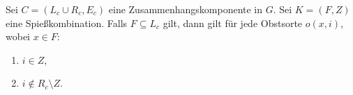 \begin{korollar}\label{kor:komponente-mengen}
Sei $C = (L_c \cup R_c, E_c)$ eine Zusammenhangskomponente in $G$.
Sei $K = (F, Z)$ eine Spießkombination.
Falls $F \subseteq L_c$ gilt, dann gilt für jede Obstsorte $o(x, i)$, wobei $x \in F$:
\begin{enumerate}[label={\upshape(\roman*)}]
	\item $i \in Z$,
	\item $i \notin R_c \setminus Z$.
\end{enumerate}
\end{korollar}

\begin{comment}
\begin{proof}
\ref{lem:komponente-mengen1} gilt nach Defintion \ref{def:spiesskomb}, Axiom \ref{ax:obstsorte-index}
und Lemma \ref{lem:spiess-numbers}.\\
\ref{lem:komponente-mengen2} gilt aus dem Grund, dass $L_c$ und $R_c$ gleichmächtig sind.
(Sonst, könnte man nicht allen $x \in A$ einen $y \in B$ zuweisen.)
\TODO{Beweis zu Ende}
\end{proof}
\end{comment}
